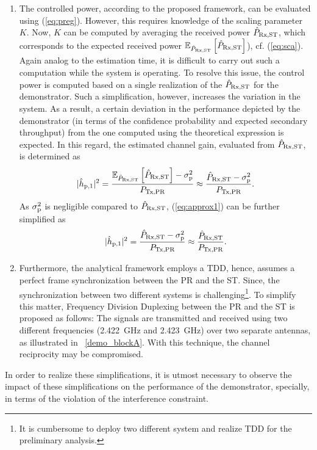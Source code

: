 \begin{enumerate}
	\item The controlled power, according to the proposed framework, can be evaluated using (\ref{eq:preg}). However, this requires knowledge of the scaling parameter $K$. Now, $K$ can be computed by averaging the received power $\hat{P}_{\text{Rx,ST}}$, which corresponds to the expected received power ${\mathbb E}_{\hat{P}_{\text{Rx,ST}}}\left[ \hat{P}_{\text{Rx,ST}} \right]$), cf. (\ref{eq:sca}). Again analog to the estimation time, it is difficult to carry out such a computation while the system is operating. To resolve this issue, the control power is computed based on a single realization of the $\hat{P}_{\text{Rx,ST}}$ for the demonstrator. Such a simplification, however, increases the variation in the system. As a result, a certain deviation in the performance depicted by the demonstrator (in terms of the confidence probability and expected secondary throughput) from the one computed using the theoretical expression is expected. 
In this regard, the estimated channel gain, evaluated from $\hat{P}_{\text{Rx,ST}}$, is determined as 
	\begin{equation}
		|\hat{h}_{\text{p,1}}|^2 = \frac{{\mathbb E}_{\hat{P}_{\text{Rx,ST}}}\left[ \hat{P}_{\text{Rx,ST}} \right]-\sigma^2_{\text{p}}}{P_{\text{Tx,PR}}} \approx \frac{\hat{P}_{\text{Rx,ST}}-\sigma^2_{\text{p}}}{P_{\text{Tx,PR}}}. 
		\label{eq:approx1}
	\end{equation}	
As $\sigma^2_{\text{p}}$ is negligible compared to $\hat{P}_{\text{Rx,ST}}$, (\ref{eq:approx1}) can be further simplified as 
	\begin{equation}
		|\hat{h}_{\text{p,1}}|^2 = \frac{\hat{P}_{\text{Rx,ST}}-\sigma^2_{\text{p}}}{P_{\text{Tx,PR}}} \approx \frac{\hat{P}_{\text{Rx,ST}}}{P_{\text{Tx,PR}}}.
		\label{eq:approx2}
	\end{equation}	
	\item Furthermore, the analytical framework employs a TDD, hence, assumes a perfect frame synchronization between the PR and the ST. Since, the synchronization between two different systems is challenging\footnote{It is cumbersome to deploy two different system and realize TDD for the preliminary analysis.}. To simplify this matter, Frequency Division Duplexing between the PR and the ST is proposed as follows: The signals are transmitted and received using two different frequencies (\SI{2.422}{GHz} and \SI{2.423}{GHz}) over two separate antennas, as illustrated in \figurename~\ref{demo_blockA}. With this technique, the channel reciprocity may be compromised.	
\end{enumerate}
In order to realize these simplifications, it is utmost necessary to observe the impact of these simplifications on the performance of the demonstrator, specially, in terms of the violation of the interference constraint. 
